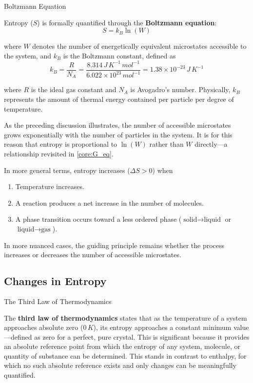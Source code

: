 \documentclass[10pt]{article}
\begin{document}
    \begin{core}{Boltzmann Equation}

      Entropy ($S$) is formally quantified through the \textbf{Boltzmann equation}:
      \[
        S = k_B \ln(W)
      \]

      where $W$ denotes the number of energetically equivalent microstates accessible to the system, and $k_B$ is the Boltzmann constant, defined as
      \[
        k_B = \frac{R}{N_A} = \frac{8.314\,J\,K^{-1}\,mol^{-1}}{6.022 \times 10^{23}\,mol^{-1}} = 1.38 \times 10^{-23}\,J\,K^{-1}
      \]

      where $R$ is the ideal gas constant and $N_A$ is Avogadro's number. Physically, $k_B$ represents the amount of thermal energy contained per particle per degree of temperature.

      As the preceding discussion illustrates, the number of accessible microstates grows exponentially with the number of particles in the system. It is for this reason that entropy is proportional to $\ln(W)$ rather than $W$ directly---a relationship revisited in \autoref{core:G_eq}.

      In more general terms, entropy increases ($\Delta S > 0$) when

      \begin{enumerate}

        \item Temperature increases.

        \item A reaction produces a net increase in the number of molecules.

        \item A phase transition occurs toward a less ordered phase ($\text{solid} \rightarrow \text{liquid}$ or $\text{liquid} \rightarrow \text{gas}$).

      \end{enumerate}

      In more nuanced cases, the guiding principle remains whether the process increases or decreases the number of accessible microstates.

    \end{core}

  \subsection{Changes in Entropy}

    \begin{core}{The Third Law of Thermodynamics}

      The \textbf{third law of thermodynamics} states that as the temperature of a system approaches absolute zero ($0\,K$), its entropy approaches a constant minimum value---defined as zero for a perfect, pure crystal. This is significant because it provides an absolute reference point from which the entropy of any system, molecule, or quantity of substance can be determined. This stands in contrast to enthalpy, for which no such absolute reference exists and only changes can be meaningfully quantified.

    \end{core}
\end{document}
